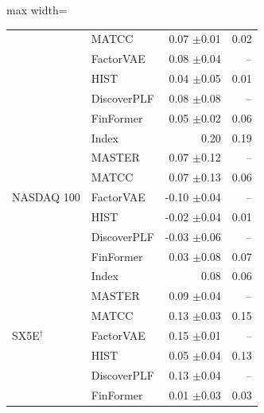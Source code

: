 \begin{table}[tb]
\begin{adjustbox}{max width=\textwidth}
{\begin{tabular}{llrr}
 & MATCC & 0.07 {\scriptsize$\pm$0.01} & 0.02 \\
 & FactorVAE & 0.08 {\scriptsize$\pm$0.04} & -- \\
 & HIST & 0.04 {\scriptsize$\pm$0.05} & 0.01 \\
 & DiscoverPLF & 0.08 {\scriptsize$\pm$0.08} & -- \\
 & FinFormer & 0.05 {\scriptsize$\pm$0.02} & 0.06 \\
\midrule
\multirow{7}{*}{NASDAQ 100} & Index & 0.20 & 0.19 \\
 & MASTER & 0.07 {\scriptsize$\pm$0.12} & -- \\
 & MATCC & 0.07 {\scriptsize$\pm$0.13} & 0.06 \\
 & FactorVAE & -0.10 {\scriptsize$\pm$0.04} & -- \\
 & HIST & -0.02 {\scriptsize$\pm$0.04} & 0.01 \\
 & DiscoverPLF & -0.03 {\scriptsize$\pm$0.06} & -- \\
 & FinFormer & 0.03 {\scriptsize$\pm$0.08} & 0.07 \\
\midrule
\multirow{7}{*}{SX5E$^\dagger$} & Index & 0.08 & 0.06 \\
 & MASTER & 0.09 {\scriptsize$\pm$0.04} & -- \\
 & MATCC & 0.13 {\scriptsize$\pm$0.03} & 0.15 \\
 & FactorVAE & 0.15 {\scriptsize$\pm$0.01} & -- \\
 & HIST & 0.05 {\scriptsize$\pm$0.04} & 0.13 \\
 & DiscoverPLF & 0.13 {\scriptsize$\pm$0.04} & -- \\
 & FinFormer & 0.01 {\scriptsize$\pm$0.03} & 0.03 \\
\bottomrule
\end{tabular}
}
\end{adjustbox}
\label{tab:finbench_portfolio_horizons}
\end{table}
